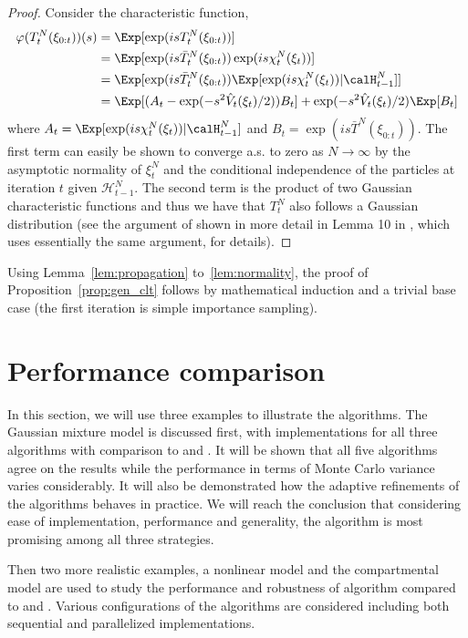 \begin{proof}
  Consider the characteristic function,
  \begin{align*}
    \varphi(T_t^N(\xi_{0:t}))(s)
    &= \Exp[\exp(isT_t^N(\xi_{0:t}))] \\
    &= \Exp[\exp(is\bar{T}_t^N(\xi_{0:t}))\exp(is\chi_t^N(\xi_t))] \\
    &= \Exp[\exp(is\bar{T}_t^N(\xi_{0:t}))
    \Exp[\exp(is\chi_t^N(\xi_t))|\calH_{t-1}^N]] \\
    &= \Exp[(A_t - \exp(-s^2\hat{V}_t(\xi_t)/2))B_t]
    +\exp(-s^2\hat{V}_t(\xi_t)/2)\Exp[B_t]
  \end{align*}
  where $A_t = \Exp[\exp(is\chi_t^N(\xi_t))|\calH_{t-1}^N]$ and $B_t =
  \exp(is\bar{T}^N(\xi_{0:t}))$. The first term can easily be shown to
  converge a.s. to zero as $N\to\infty$ by the asymptotic normality of
  $\xi_t^N$ and the conditional independence of the particles at iteration $t$
  given $\mathcal{H}_{t-1}^N$.  The second term is the product of two Gaussian
  characteristic functions and thus we have that $T_t^N$ also follows a
  Gaussian distribution (see the argument of \cite{Kuensch:2005} shown in more
  detail in Lemma 10{} in \cite{Johansen:2006iv}, which uses essentially the
  same argument, for details).
\end{proof}

Using Lemma~\ref{lem:propagation} to~\ref{lem:normality}, the proof of
Proposition~\ref{prop:gen_clt} follows by mathematical induction and a trivial
base case (the first iteration is simple importance sampling).

\section{Performance comparison}
\label{sec:Performance comparison}

In this section, we will use three examples to illustrate the algorithms. The
Gaussian mixture model is discussed first, with implementations for all three
\smc algorithms with comparison to \rjmcmc and \pmcmc. It will be shown that
all five algorithms agree on the results while the performance in
terms of Monte Carlo variance varies considerably. It will also be
demonstrated how the adaptive refinements of the algorithms behaves in
practice. We will reach the conclusion that considering ease of
implementation, performance and generality, the \smc[2] algorithm is most
promising among all three strategies.

Then two more realistic examples, a nonlinear \ode model and the \pet
compartmental model are used to study the performance and robustness of
algorithm \smc[2] compared to \ais and \pmcmc. Various configurations of the
algorithms are considered including both sequential and parallelized
implementations.

